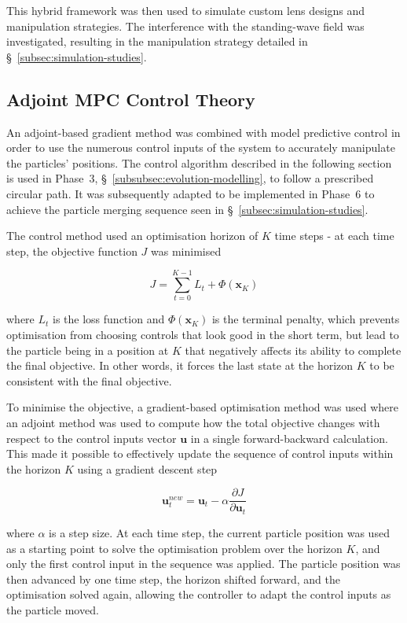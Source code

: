 \documentclass[11pt,a4paper]{article}
\begin{document}
This hybrid framework was then used to simulate custom lens designs and manipulation strategies. The interference with the standing-wave field was investigated, resulting in the manipulation strategy detailed in \S~\ref{subsec:simulation-studies}.

\subsection{Adjoint MPC Control Theory}
\label{subsec:adjoint-mpc}


An adjoint-based gradient method was combined with model predictive control \cite{rakovic2019mpc} in order to use the numerous control inputs of the system to accurately manipulate the particles' positions. The control algorithm described in the following section is used in Phase~3, \S~\ref{subsubsec:evolution-modelling}, to follow a prescribed circular path. It was subsequently adapted to be implemented in Phase~6 to achieve the particle merging sequence seen in \S~\ref{subsec:simulation-studies}. 

The control method used an optimisation horizon of $K$ time steps - at each time step, the objective function $J$ was minimised 


\begin{equation}
J =
\sum_{t=0}^{K-1} L_t
+
\Phi(\mathbf{x}_K)
\end{equation}

\noindent where $L_t$ is the loss function and $\Phi(\mathbf{x}_K)$ is the terminal penalty, which prevents optimisation from choosing controls that look good in the short term, but lead to the particle being in a position at $K$ that negatively affects its ability to complete the final objective. In other words, it forces the last state at the horizon $K$ to be consistent with the final objective.

To minimise the objective, a gradient-based optimisation method was used where an adjoint method was used to compute how the total objective changes with respect to the control inputs vector $\mathbf{u}$ in a single forward-backward calculation. This made it possible to effectively update the sequence of control inputs within the horizon $K$ using a gradient descent step 

\begin{equation}
\mathbf{u}_t^{new} = \mathbf{u}_t - \alpha \frac{\partial J}{\partial \mathbf{u}_t} 
\end{equation}


\noindent where $\alpha$ is a step size. At each time step, the current particle position was used as a starting point to solve the optimisation problem over the horizon $K$, and only the first control input in the sequence was applied. The particle position was then advanced by one time step, the horizon shifted forward, and the optimisation solved again, allowing the controller to adapt the control inputs as the particle moved. 
\end{document}
